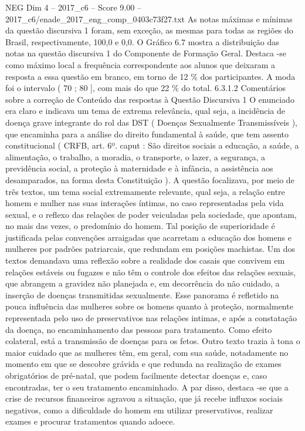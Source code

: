 \begin{textsample}{NEG Dim 4 – 2017\_c6 – Score 9.00 – 2017\_c6/enade\_2017\_eng\_comp\_0403c73f27.txt}
As notas máximas e mínimas da questão discursiva 1 foram, sem exceção, as mesmas para todas as regiões do Brasil, respectivamente, 100,0 e 0,0.
O Gráfico 6.7 mostra a distribuição das notas na questão discursiva 1 do Componente de Formação Geral.
Destaca -se como máximo local a frequência correspondente aos alunos que deixaram a resposta a essa questão em branco, em torno de 12 \% dos participantes.
A moda foi o intervalo ( 70 ; 80 ], com mais do que 22 \% do total. 6.3.1.2 Comentários sobre a correção de Conteúdo das respostas à Questão Discursiva 1 O enunciado era claro e indicava um tema de extrema relevância, qual seja, a incidência de doença grave integrante do rol das DST ( Doenças Sexualmente Transmissíveis ), que encaminha para a análise do direito fundamental à saúde, que tem assento constitucional ( CRFB, art. 6º. caput : São direitos sociais a educação, a saúde, a alimentação, o trabalho, a moradia, o transporte, o lazer, a segurança, a previdência social, a proteção à maternidade e à infância, a assistência aos desamparados, na forma desta Constituição ).
A questão focalizava, por meio de três textos, um tema social extremamente relevante, qual seja, a relação entre homem e mulher nas suas interações íntimas, no caso representadas pela vida sexual, e o reflexo das relações de poder veiculadas pela sociedade, que apontam, no mais das vezes, o predomínio do homem.
Tal posição de superioridade é justificada pelas convenções arraigadas que acarretam a educação dos homens e mulheres por padrões patriarcais, que redundam em posições machistas.
Um dos textos demandava uma reflexão sobre a realidade dos casais que convivem em relações estáveis ou fugazes e não têm o controle dos efeitos das relações sexuais, que abrangem a gravidez não planejada e, em decorrência do não cuidado, a inserção de doenças transmitidas sexualmente.
Esse panorama é refletido na pouca influência das mulheres sobre os homens quanto à proteção, normalmente representada pelo uso de preservativos nas relações intimas, e após a constatação da doença, no encaminhamento das pessoas para tratamento.
Como efeito colateral, está a transmissão de doenças para os fetos.
Outro texto trazia à tona o maior cuidado que as mulheres têm, em geral, com sua saúde, notadamente no momento em que se descobre grávida e que redunda na realização de exames obrigatórios de pré-natal, que podem facilmente detectar doenças e, caso encontradas, ter o seu tratamento encaminhado.
A par disso, destaca -se que a crise de recursos financeiros agravou a situação, que já recebe influxos sociais negativos, como a dificuldade do homem em utilizar preservativos, realizar exames e procurar tratamentos quando adoece.

\end{textsample}
